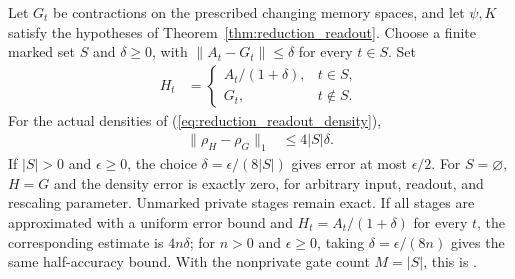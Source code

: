 \begin{theorem}
    \label{thm:reduction_marked_budget}
    \leanok
    Let $G_t$ be contractions on the prescribed changing memory spaces,
    and let $\psi,K$ satisfy the hypotheses of
    Theorem~\ref{thm:reduction_readout}. Choose a finite marked set $S$
    and $\delta\geq0$, with $\lVert A_t-G_t\rVert\leq\delta$ for
    every $t\in S$. Set
    \begin{align}
        H_t & =\begin{cases}
                   A_t/(1+\delta), & t\in S,    \\
                   G_t,            & t\notin S.
               \end{cases}
        \label{eq:reduction_marked_gates}
    \end{align}
    For the actual densities of (\ref{eq:reduction_readout_density}),
    \begin{align}
        \lVert\rho_H-\rho_G\rVert_1 & \leq4|S|\delta.
        \label{eq:reduction_marked_error}
    \end{align}
    If $|S|>0$ and $\epsilon\geq0$, the choice
    $\delta=\epsilon/(8|S|)$ gives error at most $\epsilon/2$.
    For $S=\varnothing$, $H=G$ and the density error is exactly zero,
    for arbitrary input, readout, and rescaling parameter.
    Unmarked private stages remain exact.
    If all stages are approximated with a uniform error bound and
    $H_t=A_t/(1+\delta)$ for every $t$, the corresponding estimate is
    $4n\delta$; for $n>0$ and $\epsilon\geq0$, taking
    $\delta=\epsilon/(8n)$ gives the same
    half-accuracy bound.
    With the nonprivate gate count $M=|S|$, this is
    \cite[Equation~(5.3)]{OpenAI2026PolynomialPEPS}.
\end{theorem}


